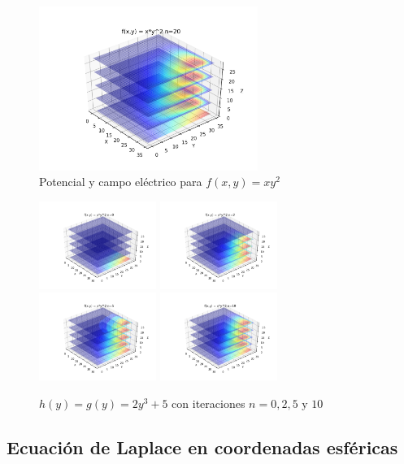 \documentclass[10pt,journal,compsoc]{IEEEtran}
\begin{document}
\begin{figure}
  \centering
  \includegraphics[width=2.8in]{images/xy2-n20}
  \caption{Potencial y campo eléctrico para \(f(x,y) = xy^2\)}
  \label{xy2-n20}
\end{figure}

\begin{figure}
  \centering
  \includegraphics[width=1.5in]{images/xy2-n0}
  \includegraphics[width=1.5in]{images/xy2-n2}
  \includegraphics[width=1.5in]{images/xy2-n5}
  \includegraphics[width=1.5in]{images/xy2-n10}
  \caption{\(h(y) = g(y) = 2y^3+5\) con iteraciones \(n = 0, 2, 5 \text{ y } 10\)}
  \label{xy2-iterations}
\end{figure}


\subsection{Ecuación de Laplace en coordenadas esféricas}
\end{document}
